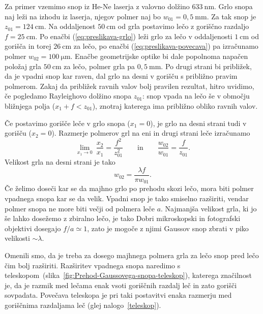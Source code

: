 Za primer vzemimo snop iz He-Ne laserja z valovno dolžino 
$633~\si{\nano\metre}$. Grlo snopa naj leži na izhodu iz laserja, njegov polmer naj bo 
$w_{01}=0,5~\si{\milli\metre}$. Za tak snop je $z_{01}=124~\si{\centi\metre}$. 
Na oddaljenost $50~\si{\centi\metre}$ od grla postavimo lečo z goriščno razdaljo 
$f=25~\si{\centi\metre}$. Po enačbi (\ref{eq:preslikava-grlo})
leži grlo za lečo v oddaljenosti $1~\si{\centi\metre}$ od gorišča in torej $26~\si{\centi\metre}$ 
za lečo, po enačbi (\ref{eq:preslikava-povecava})
pa izračunamo polmer $w_{02}=100~\si{\micro\metre}$. Enačbe geometrijske optike bi
dale popolnoma napačen položaj grla $50~\si{\centi\metre}$ za lečo, polmer grla pa 
$0,5~\si{\milli\metre}$. Po drugi strani bi približek, da je vpadni
snop kar raven, dal grlo na desni v gorišču s približno pravim polmerom. Zakaj da približek ravnih 
valov bolj pravilen rezultat, hitro uvidimo, če pogledamo
Rayleighovo dolžino snopa $z_{01}$: 
snop vpada na lečo še v območju bližnjega polja ($x_1 + f < z_{01}$), znotraj katerega
ima približno obliko ravnih valov. 

Če postavimo gorišče leče v grlo snopa ($x_{1}=0$), je grlo na
desni strani tudi v gorišču ($x_{2}=0$). Razmerje polmerov grl
na eni in drugi strani leče izračunamo
\begin{equation}
\lim_{x_1 \to 0}~\frac{x_{2}}{x_{1}}=\frac{f^{2}}{z_{01}^{2}} \qquad \textrm{in} \qquad
\frac{w_{02}}{w_{01}}= \frac{f}{z_{01}}.
\end{equation}
Velikost grla na desni strani je tako
\begin{equation}
w_{02}=\frac{\lambda f}{\pi w_{01}}.
\end{equation}
Če želimo doseči kar se da majhno grlo po prehodu skozi lečo, mora biti polmer
vpadnega snopa kar se da velik. Vpadni snop je tako smiselno
razširiti, vendar polmer snopa ne more biti večji od polmera leče $a$. 
Najmanjša velikost grla, ki jo še lahko dosežemo z zbiralno lečo, je tako 
Dobri mikroskopski in fotografski
objektivi dosegajo $f/a\simeq 1$, zato je mogoče z njimi Gaussov snop
zbrati v piko velikosti $\sim\lambda$. 

Omenili smo, da je treba za dosego majhnega polmera grla za lečo snop pred lečo čim bolj razširiti.
Razširitev vpadnega snopa naredimo s teleskopom~(slika~\ref{fig:Prehod-Gaussovega-snopa-teleskop}),
katerega značilnost je, da je razmik med lečama enak vsoti goriščnih razdalj leč in zato gorišči
sovpadata. Povečava teleskopa je pri taki postavitvi enaka razmerju med goriščnima razdaljama leč
(glej nalogo~\ref{teleskop}).

